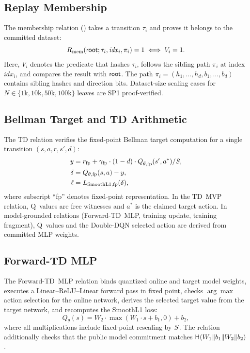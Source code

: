 \subsection{Replay Membership}

The membership relation () takes a transition $\tau_i$
and proves it belongs to the committed dataset:
\begin{equation}\label{eq:membership}
  R_{\mathrm{mem}}(\mathsf{root};\tau_i,\mathit{idx}_i,\pi_i)=1
  \iff V_i=1.
\end{equation}
Here, $V_i$ denotes the predicate that hashes $\tau_i$, follows the sibling
path $\pi_i$ at index $\mathit{idx}_i$, and compares the result with $\mathsf{root}$.
The path $\pi_i = (h_1, \ldots, h_d, b_1, \ldots, b_d)$ contains sibling hashes
and direction bits.
Dataset-size scaling cases for $N \in \{1\text{k}, 10\text{k}, 50\text{k}, 100\text{k}\}$
leaves are SP1 proof-verified.

\subsection{Bellman Target and TD Arithmetic}

The TD relation verifies the fixed-point Bellman target computation for a
single transition $(s, a, r, s', d)$:
\begin{align}
  y &= r_{\mathrm{fp}} + \gamma_{\mathrm{fp}} \cdot (1 - d) \cdot
       Q_{\bar\theta,\mathrm{fp}}(s', a^*) / S, \label{eq:td-target}\\
  \delta &= Q_{\theta,\mathrm{fp}}(s, a) - y, \label{eq:td-error}\\
  \ell &= L_{\mathrm{SmoothL1,fp}}(\delta), \label{eq:td-loss}
\end{align}
where subscript ``fp'' denotes fixed-point representation. In the TD~MVP
relation, Q~values are free witnesses and $a^*$ is the claimed target action.
In model-grounded relations (Forward-TD~MLP, training update, training
fragment), Q~values and the Double-DQN selected action are derived from
committed MLP weights.

\subsection{Forward-TD MLP}

The Forward-TD~MLP relation binds quantized online and target model weights,
executes a Linear--ReLU--Linear forward pass in fixed point, checks
$\arg\max$ action selection for the online network, derives the selected
target value from the target network, and recomputes the SmoothL1 loss:
\begin{equation}\label{eq:forward-td}
  Q_\theta(s) = W_2 \cdot \max(W_1 \cdot s + b_1, 0) + b_2,
\end{equation}
where all multiplications include fixed-point rescaling by $S$.
The relation additionally checks that the public model commitment matches
$\mathsf{H}(W_1 \| b_1 \| W_2 \| b_2)$.

